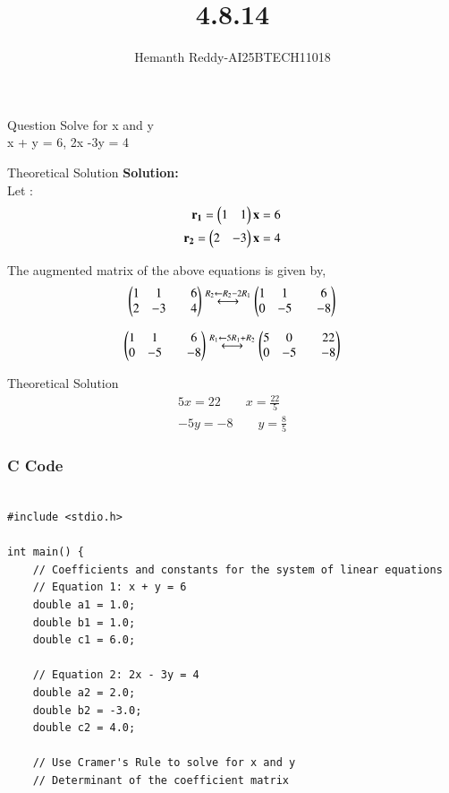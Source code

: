 \documentclass{beamer}
\title %
{ 4.8.14}
\author %
{Hemanth Reddy-AI25BTECH11018}
\begin{document}
\frame{\titlepage}
\begin{frame}{Question}
Solve for x and y\\

x + y = 6, 2x -3y = 4\\
\end{frame}



\begin{frame}{Theoretical Solution}
\textbf{Solution:}\\


Let :
\begin{align}
    \mathbf{r_1} = \begin{pmatrix}1 & 1 \end{pmatrix}\mathbf{x} = 6 \\
    \mathbf{r_2} = \begin{pmatrix}2 & -3\end{pmatrix}\mathbf{x} = 4
\end{align}

The augmented matrix of the above equations is given by,\\
\begin{align}
    \begin{pmatrix} 1&1&&6\\ 2&-3&&4\end{pmatrix} \stackrel{R_2 \leftarrow R_2 - 2R_1}{\longleftrightarrow}\begin{pmatrix} 1&1&&6\\ 0&-5&&-8\end{pmatrix} 
\end{align}

\begin{align}
    \begin{pmatrix} 1&1&&6\\ 0&-5&&-8\end{pmatrix} \stackrel{R_1 \leftarrow 5R_1 +R_2}{\longleftrightarrow}\begin{pmatrix} 5&0&&22\\ 0&-5&&-8\end{pmatrix} 
\end{align}


\end{frame}
\begin{frame}{Theoretical Solution}
\begin{align}
    5x=22 \qquad x=\frac{22}{5}\\
    -5y=-8 \qquad y=\frac{8}{5}
\end{align}
\end{frame}

\begin{frame}[fragile]
    \frametitle{C Code }
    \begin{lstlisting}

#include <stdio.h>

int main() {
    // Coefficients and constants for the system of linear equations
    // Equation 1: x + y = 6
    double a1 = 1.0;
    double b1 = 1.0;
    double c1 = 6.0;

    // Equation 2: 2x - 3y = 4
    double a2 = 2.0;
    double b2 = -3.0;
    double c2 = 4.0;

    // Use Cramer's Rule to solve for x and y
    // Determinant of the coefficient matrix
  


    \end{lstlisting}
\end{frame}
\end{document}
